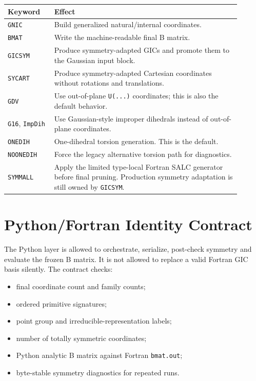 \documentclass[11pt]{article}
\begin{document}
\begin{longtable}{@{}p{0.18\linewidth}p{0.72\linewidth}@{}}
\toprule
Keyword & Effect \\
\midrule
\endhead
\texttt{GNIC} & Build generalized natural/internal coordinates. \\
\texttt{BMAT} & Write the machine-readable final B matrix. \\
\texttt{GICSYM} & Produce symmetry-adapted GICs and promote them to the Gaussian
input block. \\
\texttt{SYCART} & Produce symmetry-adapted Cartesian coordinates without
rotations and translations. \\
\texttt{GDV} & Use out-of-plane \texttt{U(...)} coordinates; this is also the
default behavior. \\
\texttt{G16}, \texttt{ImpDih} & Use Gaussian-style improper dihedrals instead
of out-of-plane coordinates. \\
\texttt{ONEDIH} & One-dihedral torsion generation.  This is the default. \\
\texttt{NOONEDIH} & Force the legacy alternative torsion path for diagnostics. \\
\texttt{SYMMALL} & Apply the limited type-local Fortran SALC generator before
final pruning.  Production symmetry adaptation is still owned by
\texttt{GICSYM}. \\
\bottomrule
\end{longtable}

\section{Python/Fortran Identity Contract}

The Python layer is allowed to orchestrate, serialize, post-check symmetry and
evaluate the frozen B matrix.  It is not allowed to replace a valid Fortran GIC
basis silently.  The contract checks:

\begin{itemize}
  \item final coordinate count and family counts;
  \item ordered primitive signatures;
  \item point group and irreducible-representation labels;
  \item number of totally symmetric coordinates;
  \item Python analytic B matrix against Fortran \texttt{bmat.out};
  \item byte-stable symmetry diagnostics for repeated runs.
\end{itemize}
\end{document}

